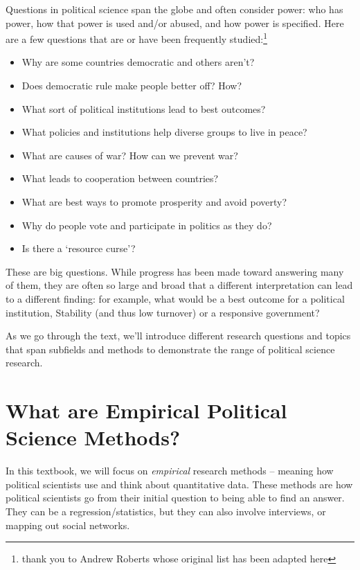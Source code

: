 \documentclass{book}
\begin{document}
Questions in political science span the globe and often consider power: who
has power, how that power is used and/or abused, and how power is specified.
Here are a few questions that are or have been frequently studied:\footnote{thank
  you to Andrew Roberts whose original list has been adapted here}

\begin{itemize}
\item
  Why are some countries democratic and others aren't?
\item
  Does democratic rule make people better off? How?
\item
  What sort of political institutions lead to best outcomes?
\item
  What policies and institutions help diverse groups to live in peace?
\item
  What are causes of war? How can we prevent war?
\item
  What leads to cooperation between countries?
\item
  What are best ways to promote prosperity and avoid poverty?
\item
  Why do people vote and participate in politics as they do?
\item
  Is there a `resource curse'?
\end{itemize}

These are big questions. While progress has been made toward answering many of
them, they are often so large and broad that a different interpretation can
lead to a different finding: for example, what would be a best outcome for a
political institution, Stability (and thus low turnover) or a responsive
government?

As we go through the text, we'll introduce different research questions and
topics that span subfields and methods to demonstrate the range of political
science research.

\hypertarget{what-are-empirical-political-science-methods}{%
\section{What are Empirical Political Science
Methods?}\label{what-are-empirical-political-science-methods}}

In this textbook, we will focus on \emph{empirical} research methods --
meaning how political scientists use and think about quantitative data. These
methods are how political scientists go from their initial question to being
able to find an answer. They can be a regression/statistics, but they can also
involve interviews, or mapping out social networks.
\end{document}
